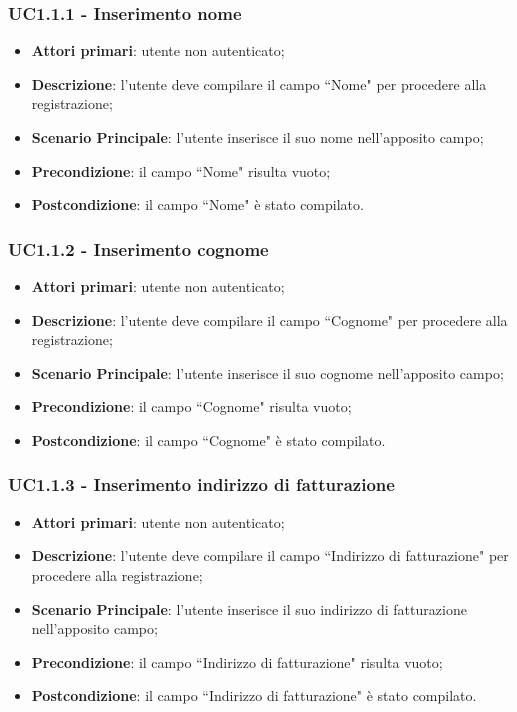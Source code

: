 \subsubsection{UC1.1.1 - Inserimento nome}
\begin{itemize}
\item \textbf{Attori primari}: utente non autenticato;
\item \textbf{Descrizione}: l'utente deve compilare il campo ``Nome" per procedere alla registrazione;
\item \textbf{Scenario Principale}: l'utente inserisce il suo nome nell'apposito campo;
\item \textbf{Precondizione}: il campo ``Nome" risulta vuoto;
\item \textbf{Postcondizione}: il campo ``Nome" è stato compilato.
\end{itemize}

\subsubsection{UC1.1.2 - Inserimento cognome}
\begin{itemize}
\item \textbf{Attori primari}: utente non autenticato;
\item \textbf{Descrizione}: l'utente deve compilare il campo ``Cognome" per procedere alla registrazione;
\item \textbf{Scenario Principale}: l'utente inserisce il suo cognome nell'apposito campo;
\item \textbf{Precondizione}: il campo ``Cognome" risulta vuoto;
\item \textbf{Postcondizione}: il campo ``Cognome" è stato compilato.
\end{itemize}

\subsubsection{UC1.1.3 - Inserimento indirizzo di fatturazione}
\begin{itemize}
\item \textbf{Attori primari}: utente non autenticato;
\item \textbf{Descrizione}: l'utente deve compilare il campo ``Indirizzo di fatturazione" per procedere alla registrazione;
\item \textbf{Scenario Principale}: l'utente inserisce il suo indirizzo di fatturazione nell'apposito campo;
\item \textbf{Precondizione}: il campo ``Indirizzo di fatturazione" risulta vuoto;
\item \textbf{Postcondizione}: il campo ``Indirizzo di fatturazione" è stato compilato.
\end{itemize}

